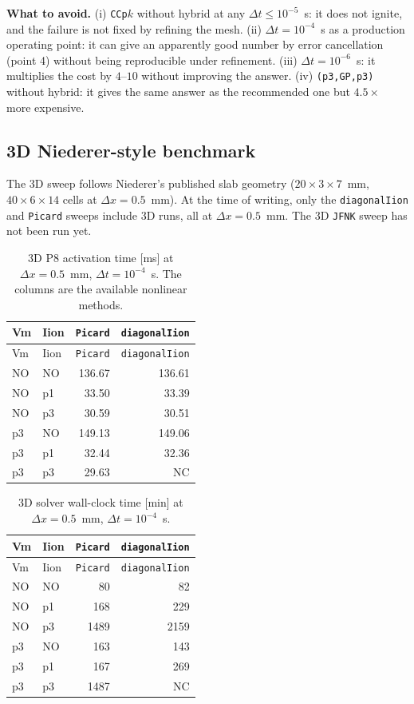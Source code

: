 \documentclass[11pt,a4paper]{article}
\newcommand{\code}[1]{\texttt{\small #1}}
\begin{document}
\noindent\textbf{What to avoid.} (i) \code{CCp$k$} without hybrid at any
$\Delta t\le 10^{-5}$~s: it does not ignite, and the failure is not fixed by refining the mesh.
(ii) $\Delta t=10^{-4}$~s as a production operating point: it can give an apparently
good number by error cancellation (point 4) without being reproducible under refinement.
(iii) $\Delta t=10^{-6}$~s: it multiplies the cost by $4$--$10$ without improving the answer.
(iv) \code{(p3,GP,p3)} without hybrid: it gives the same answer as the recommended one but
$4.5\times$ more expensive.
\subsection{3D Niederer-style benchmark}
\label{sec:results:3D}

The 3D sweep follows Niederer's published slab geometry
($20\times 3\times 7$~mm, $40\times 6\times 14$ cells at $\Delta x = 0.5$~mm). At the
time of writing, only the \code{diagonalIion} and \code{Picard} sweeps include
3D runs, all at $\Delta x = 0.5$~mm. The 3D \code{JFNK} sweep has not been run yet.

\begin{center}\footnotesize
\begin{longtable}{llrr}
\caption{3D P8 activation time [ms] at $\Delta x = 0.5$~mm,
$\Delta t = 10^{-4}$~s. The columns are the available nonlinear methods.}\\
\toprule
Vm & Iion & \code{Picard} & \code{diagonalIion} \\
\midrule\endfirsthead\toprule
Vm & Iion & \code{Picard} & \code{diagonalIion} \\
\midrule\endhead
NO & NO & 136.67 & 136.61 \\
NO & p1 &  33.50 &  33.39 \\
NO & p3 &  30.59 &  30.51 \\
p3 & NO & 149.13 & 149.06 \\
p3 & p1 &  32.44 &  32.36 \\
p3 & p3 &  29.63 & NC     \\
\bottomrule\end{longtable}\end{center}

\begin{center}\footnotesize
\begin{longtable}{llrr}
\caption{3D solver wall-clock time [min] at $\Delta x = 0.5$~mm,
$\Delta t = 10^{-4}$~s.}\\
\toprule
Vm & Iion & \code{Picard} & \code{diagonalIion} \\
\midrule\endfirsthead\toprule
Vm & Iion & \code{Picard} & \code{diagonalIion} \\
\midrule\endhead
NO & NO &   80 &   82 \\
NO & p1 &  168 &  229 \\
NO & p3 & 1489 & 2159 \\
p3 & NO &  163 &  143 \\
p3 & p1 &  167 &  269 \\
p3 & p3 & 1487 & NC   \\
\bottomrule\end{longtable}\end{center}
\end{document}
